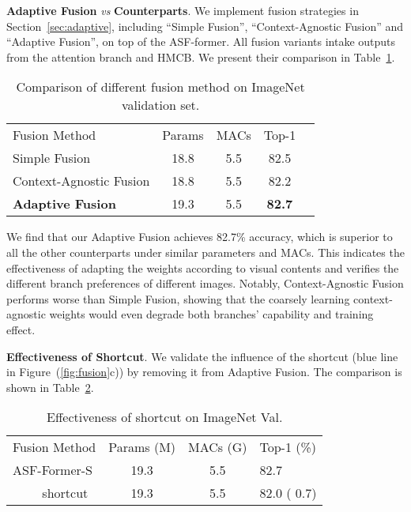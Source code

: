 \documentclass[lettersize,journal]{IEEEtran}
\begin{document}
\textbf{Adaptive Fusion} \textit{vs} \textbf{Counterparts}. We implement fusion strategies in Section~\ref{sec:adaptive}, including ``Simple Fusion'', ``Context-Agnostic Fusion'' and ``Adaptive Fusion'', on top of the ASF-former. All fusion variants intake outputs from the attention branch and HMCB. We present their comparison in Table~\ref{table:fusion}.
\setlength{\tabcolsep}{4pt}
\begin{table}[th]
\begin{center}
\caption{Comparison of different fusion method on ImageNet validation set.}
\label{table:fusion}
\begin{tabular}{lcccc}
\hline\noalign{\smallskip}
Fusion Method &Params &MACs &Top-1\\
\noalign{\smallskip}
\hline
\noalign{\smallskip}
Simple Fusion & 18.8 & 5.5 & 82.5 \\
Context-Agnostic Fusion & 18.8 & 5.5 & 82.2 \\
\textbf{Adaptive Fusion} & 19.3 & 5.5 & \textbf{82.7} \\
\hline
\end{tabular}
\end{center}
\end{table}
\setlength{\tabcolsep}{1.4pt}

We find that our Adaptive Fusion achieves 82.7\% accuracy, which is superior to all the other counterparts under similar parameters and MACs. This indicates the effectiveness of adapting the weights according to visual contents and verifies the different branch preferences of different images. Notably, Context-Agnostic Fusion performs worse than Simple Fusion, showing that the coarsely learning context-agnostic weights would even degrade both branches' capability and training effect.

\textbf{Effectiveness of Shortcut}. We validate the influence of the shortcut ({\color{blue}blue} line in Figure~(\ref{fig:fusion}c)) by removing it from Adaptive Fusion. The comparison is shown in Table~\ref{table:shortcut}.
\setlength{\tabcolsep}{4pt}
\begin{table}[th]
\begin{center}
\caption{Effectiveness of shortcut on ImageNet Val.}
\label{table:shortcut}
\begin{tabular}{lccl}
\hline\noalign{\smallskip}
Fusion Method &Params (M)&MACs (G) &Top-1 (\%)\\
\noalign{\smallskip}
\hline
\noalign{\smallskip}
ASF-Former-S & 19.3 & 5.5 & 82.7 \\
~~~~ shortcut & 19.3 & 5.5 & 82.0 ( 0.7) \\
\hline
\end{tabular}
\end{center}
\end{table}
\setlength{\tabcolsep}{1.4pt}
\end{document}
